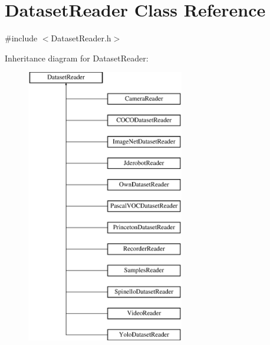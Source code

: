 \hypertarget{class_dataset_reader}{}\section{Dataset\+Reader Class Reference}
\label{class_dataset_reader}


{\ttfamily \#include $<$Dataset\+Reader.\+h$>$}

Inheritance diagram for Dataset\+Reader\+:\begin{figure}[H]
\begin{center}
\leavevmode
\includegraphics[height=12.000000cm]{class_dataset_reader}
\end{center}
\end{figure}
